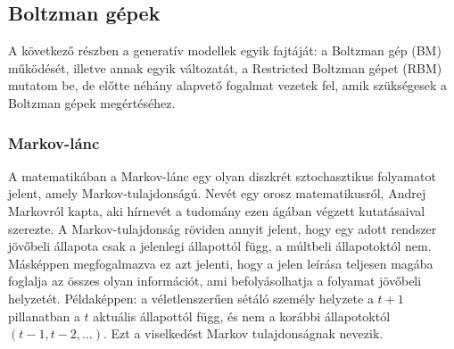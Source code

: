\subsection{Boltzman gépek}

A következő részben a generatív modellek egyik fajtáját: a Boltzman gép (BM) működését, illetve annak egyik változatát, a Restricted Boltzman gépet (RBM) mutatom be, de előtte néhány alapvető fogalmat vezetek fel, amik szükségesek a Boltzman gépek megértéséhez.




\subsubsection{Markov-lánc}

A matematikában a Markov-lánc egy olyan diszkrét sztochasztikus folyamatot jelent, amely Markov-tulajdonságú. Nevét egy orosz matematikusról, Andrej Markovról kapta, aki hírnevét a tudomány ezen ágában végzett kutatásaival szerezte. A Markov-tulajdonság röviden annyit jelent, hogy egy adott rendszer jövőbeli állapota csak a jelenlegi állapottól függ, a múltbeli állapotoktól nem. Másképpen megfogalmazva ez azt jelenti, hogy a jelen leírása teljesen magába foglalja az összes olyan információt, ami befolyásolhatja a folyamat jövőbeli helyzetét. Példaképpen: a véletlenszerűen sétáló személy helyzete a $t+1$ pillanatban a $t$ aktuális állapottól függ, és nem a korábbi állapotoktól $(t-1, t-2,\dots)$. Ezt a viselkedést Markov tulajdonságnak nevezik.

